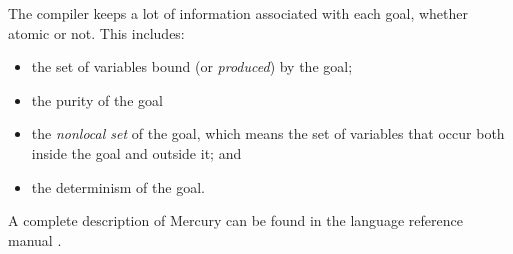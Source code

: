 The compiler keeps a lot of information associated with each goal,
whether atomic or not.
This includes:
\begin{itemize}
\item
the set of variables bound (or \emph{produced}) by the goal;
\item
the purity of the goal
\item
the \emph{nonlocal set} of the goal,
which means the set of variables
that occur both inside the goal and outside it; and
\item
the determinism of the goal.
\end{itemize}

\noindent
A complete description of Mercury
can be found in the language reference manual \cite{mercury_refman}.

